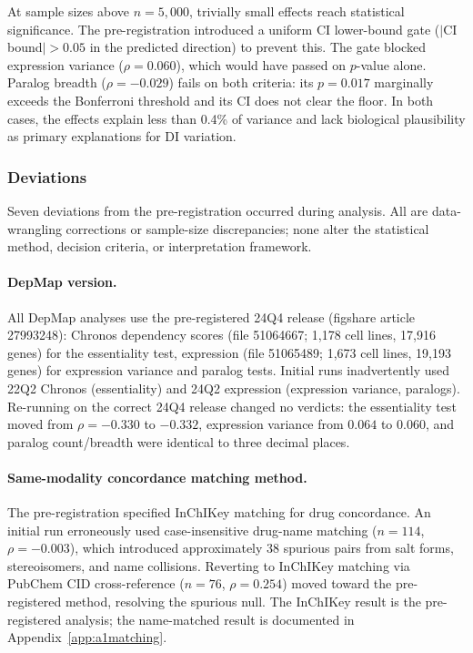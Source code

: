 \documentclass[11pt]{article}
\begin{document}
At sample sizes above $n = 5{,}000$, trivially small effects reach
statistical significance.  The pre-registration introduced a uniform
CI lower-bound gate ($|$CI bound$| > 0.05$ in the predicted direction)
to prevent this.  The gate blocked expression variance
($\rho = 0.060$), which would have passed on $p$-value alone.
Paralog breadth ($\rho = -0.029$) fails on both criteria: its
$p = 0.017$ marginally exceeds the Bonferroni threshold and its CI
does not clear the floor.  In both cases, the effects explain less than
0.4\% of variance and lack biological plausibility as primary
explanations for DI variation.

\subsubsection*{Deviations}

Seven deviations from the pre-registration occurred during analysis.
All are data-wrangling corrections or sample-size discrepancies; none
alter the statistical method, decision criteria, or interpretation
framework.

\paragraph{DepMap version.}
All DepMap analyses use the pre-registered 24Q4 release (figshare
article 27993248): Chronos dependency scores (file 51064667; 1{,}178
cell lines, 17{,}916 genes) for the essentiality test, expression
(file 51065489; 1{,}673 cell lines, 19{,}193 genes) for expression
variance and paralog tests.
Initial runs inadvertently used 22Q2 Chronos (essentiality) and 24Q2
expression (expression variance, paralogs).  Re-running on the correct 24Q4 release changed no
verdicts: the essentiality test moved from $\rho = -0.330$ to $-0.332$,
expression variance from $0.064$ to $0.060$, and paralog count/breadth
were identical to three decimal places.

\paragraph{Same-modality concordance matching method.}
The pre-registration specified InChIKey matching for drug concordance.
An initial run erroneously used case-insensitive drug-name matching
($n = 114$, $\rho = -0.003$), which introduced approximately 38
spurious pairs from salt forms, stereoisomers, and name collisions.
Reverting to InChIKey matching via PubChem CID cross-reference
($n = 76$, $\rho = 0.254$) moved toward the pre-registered method,
resolving the spurious null.  The InChIKey result is the pre-registered analysis; the
name-matched result is documented in Appendix~\ref{app:a1matching}.
\end{document}
